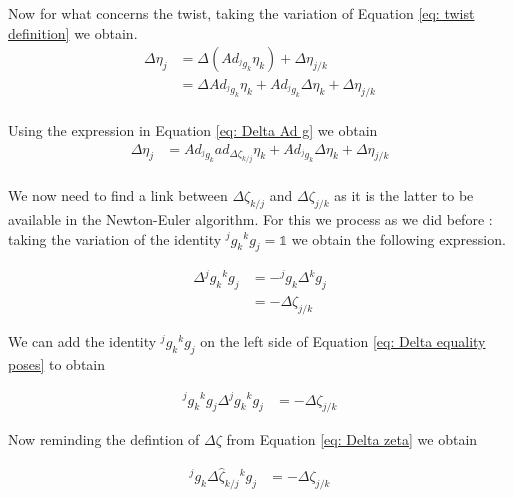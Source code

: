 \documentclass[12pt,a4paper]{book}
\begin{document}
Now for what concerns the twist, taking the variation of Equation \eqref{eq: twist definition} we obtain.
\begin{equation}
\begin{aligned}
	\Delta \eta_j 	&= \Delta \left( Ad_{^j g_k} \eta_k \right) + \Delta \eta_{j/k} \\
					&= \Delta  Ad_{^j g_k} \eta_k + Ad_{^j g_k} \Delta \eta_k  + \Delta \eta_{j/k} \\
\end{aligned}
\end{equation}

Using the expression in Equation \eqref{eq: Delta Ad g} we obtain 
\begin{equation}\label{eq: delta eta 1}
\begin{aligned}
	\Delta \eta_j 	&= Ad_{^j g_k} ad_{\Delta \zeta_{k/j}} \eta_k + Ad_{^j g_k} \Delta \eta_k  + \Delta \eta_{j/k} \\
\end{aligned}
\end{equation}


We now need to find a link between $\Delta \zeta_{k/j}$ and $\Delta \zeta_{j/k}$ as it is the latter to be available in the Newton-Euler algorithm.
For this we process as we did before : taking the variation of the identity ${^j g _k } {^k g _j } = \mathbb{1}$ we obtain the following expression.

\begin{equation}\label{eq: Delta equality poses}
\begin{aligned}
	\Delta {^j g _k } {^k g _j }	&= - {^j g _k } \Delta{^k g _j } \\
									&= - \Delta \zeta _{j/k}
\end{aligned}
\end{equation}

We can add the identity ${^j g _k } {^k g _j }$ on the left side of Equation \eqref{eq: Delta equality poses} to obtain 

\begin{equation}\label{eq: Delta equality poses 2 }
\begin{aligned}
	{^j g _k } {^k g _j } \Delta {^j g _k } {^k g _j }	&= - \Delta \zeta _{j/k}
\end{aligned}
\end{equation}

Now reminding the defintion of $\Delta \zeta $ from Equation \eqref{eq: Delta zeta} we obtain 

\begin{equation}\label{eq: Delta equality poses 3 }
\begin{aligned}
	{^j g _k } \Delta \hat{\zeta} _ {k/j} {^k g _j }	&= - \Delta \zeta _{j/k}
\end{aligned}
\end{equation}
\end{document}
